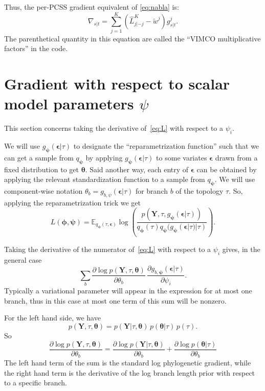 \documentclass{article}
\begin{document}
Thus, the per-PCSS gradient equivalent of \eqref{eq:nabla} is:
\begin{equation}\label{eq:nablaVIMCO}
    \nabla_{s|t} = \sum\limits_{j=1}^{K} (\hat{L}_{j|-j}^K - \tilde{w}^j) g_{s|t}^j.
\end{equation}
The parenthetical quantity in this equation are called the ``VIMCO multiplicative factors'' in the code.


\section*{Gradient with respect to scalar model parameters $\psi$}

This section concerns taking the derivative of~\eqref{eq:L} with respect to a $\psi_i$.

We will use $g_{\bm{\psi}}(\bm{\epsilon}|\tau)$ to designate the ``reparametrization function'' such that we can get a sample from $q_{\bm\psi}$ by applying $g_{\bm{\psi}}(\bm{\epsilon}|\tau)$ to some variates $\bm\epsilon$ drawn from a fixed distribution to get $\bm\theta$.
Said another way, each entry of $\bm{\epsilon}$ can be obtained by applying the relevant standardization function to a sample from $q_{\bm\psi}$.
We will use component-wise notation $\theta_b = g_{b, \psi}(\bm\epsilon|\tau)$ for branch $b$ of the topology $\tau$.
So, applying the reparametrization trick we get
\begin{equation}
L(\bm{\phi},{\bm{\psi}}) = \mathbb{E}_{
    q_{\bm{\phi}}(\tau,\bm{\epsilon})}
    \log\left(
        \frac
        {p(\bm{Y},\tau,g_{\bm{\psi}}(\bm{\epsilon}|\tau))}
        {q_{\bm{\phi}}(\tau)q_{\bm{\psi}}(g_{\bm{\psi}}(\bm{\epsilon}|\tau)|\tau)}
    \right).
\label{eq:L}
\end{equation}

Taking the derivative of the numerator of~\eqref{eq:L} with respect to a $\psi_i$ gives, in the general case
\begin{equation}
    \sum_b
    \frac{\partial \log p(\bm{Y} , \tau, \bm\theta)}{\partial \theta_b} \,
    \frac{\partial g_{b,\bm\psi}(\bm\epsilon | \tau)}{\partial \psi_i}.
    \label{eq:dlogpdPsi}
\end{equation}
Typically a variational parameter will appear in the expression for at most one branch, thus in this case at most one term of this sum will be nonzero.

For the left hand side, we have
\[
p(\bm{Y},\tau,\bm\theta) =
p(\bm{Y}|\tau,\bm\theta) \, p(\bm\theta | \tau) \, p(\tau).
\]
So
\begin{equation*}
\frac{\partial \log p(\bm{Y}, \tau, \bm\theta)}{\partial \theta_b} =
\frac{\partial \log p(\bm{Y} | \tau, \bm\theta)}{\partial \theta_b}
+
\frac{\partial \log p(\bm\theta | \tau)}{\partial \theta_b}
\end{equation*}
The left hand term of the sum is the standard log phylogenetic gradient, while the right hand term is the derivative of the log branch length prior with respect to a specific branch.
\end{document}

